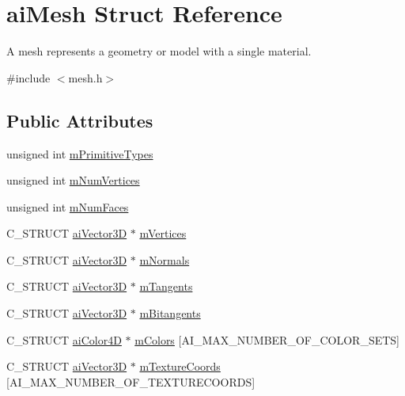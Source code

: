 \hypertarget{structai_mesh}{}\section{ai\+Mesh Struct Reference}
\label{structai_mesh}


A mesh represents a geometry or model with a single material.  




{\ttfamily \#include $<$mesh.\+h$>$}

\subsection*{Public Attributes}
\begin{DoxyCompactItemize}
\item 
unsigned int \hyperlink{structai_mesh_a99d66ac0a444068c1b252b30265cbf53}{m\+Primitive\+Types}
\item 
unsigned int \hyperlink{structai_mesh_ab34b7b5941e6636f1c08f615cbb072ef}{m\+Num\+Vertices}
\item 
unsigned int \hyperlink{structai_mesh_aeed22ee6963b79548f3877b3c905518e}{m\+Num\+Faces}
\item 
C\+\_\+\+S\+T\+R\+U\+CT \hyperlink{structai_vector3_d}{ai\+Vector3D} $\ast$ \hyperlink{structai_mesh_afd4588abb3e1c72821ae0234a3850662}{m\+Vertices}
\item 
C\+\_\+\+S\+T\+R\+U\+CT \hyperlink{structai_vector3_d}{ai\+Vector3D} $\ast$ \hyperlink{structai_mesh_aec81b496b4d93838cef038933dabe9b9}{m\+Normals}
\item 
C\+\_\+\+S\+T\+R\+U\+CT \hyperlink{structai_vector3_d}{ai\+Vector3D} $\ast$ \hyperlink{structai_mesh_af367ff78bd69f3e83d7edc8ad67dc5df}{m\+Tangents}
\item 
C\+\_\+\+S\+T\+R\+U\+CT \hyperlink{structai_vector3_d}{ai\+Vector3D} $\ast$ \hyperlink{structai_mesh_ab2a81bfe1731f01271ebab274a8f01c4}{m\+Bitangents}
\item 
C\+\_\+\+S\+T\+R\+U\+CT \hyperlink{structai_color4_d}{ai\+Color4D} $\ast$ \hyperlink{structai_mesh_ad9215f67bd0c2277b10775a8adb66b96}{m\+Colors} \mbox{[}A\+I\+\_\+\+M\+A\+X\+\_\+\+N\+U\+M\+B\+E\+R\+\_\+\+O\+F\+\_\+\+C\+O\+L\+O\+R\+\_\+\+S\+E\+TS\mbox{]}
\item 
C\+\_\+\+S\+T\+R\+U\+CT \hyperlink{structai_vector3_d}{ai\+Vector3D} $\ast$ \hyperlink{structai_mesh_a4a50b11d00ef50f419c75cab0f6bddd6}{m\+Texture\+Coords} \mbox{[}A\+I\+\_\+\+M\+A\+X\+\_\+\+N\+U\+M\+B\+E\+R\+\_\+\+O\+F\+\_\+\+T\+E\+X\+T\+U\+R\+E\+C\+O\+O\+R\+DS\mbox{]}

\end{DoxyCompactItemize}

